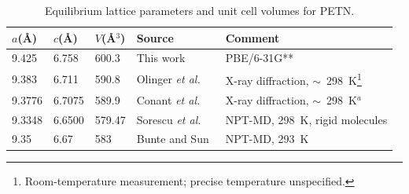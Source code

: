 \documentclass[prb,aps,nobibnotes,twocolumn,doublespace,twocolumngrid,superbib]{revtex4}
\begin{document}
 


\begin{table}[p]
\caption{Equilibrium lattice parameters and unit cell volumes for PETN.}
\begin{center}
\begin{tabular}{lllll}
\hline\hline
$a$(\AA) & $c$(\AA) & $V$(\AA$^3$) & Source & Comment\\
\hline
9.425  & 6.758  &  600.3  & This work & PBE/6-31G**\\
9.383  & 6.711  &  590.8  & Olinger {\it et al.}~\cite{Olinger_1975v62} 
& X-ray diffraction, $\sim$~298~K\footnote{Room-temperature measurement; 
precise temperature unspecified.}\\
9.3776 & 6.7075 &  589.9  & Conant {\it et al.}~\cite{Conant_1979} &
X-ray diffraction, $\sim$~298~K$^a$\\
9.3348 & 6.6500 &  579.47 & Sorescu {\it et al.}~\cite{Sorescu_1999v103} &
NPT-MD, 298~K, rigid molecules \\
9.35   & 6.67   &  583    & Bunte and Sun~\cite{Bunte_2000v104} &
 NPT-MD, 293~K \\
\hline\hline
\end{tabular}
\end{center}
\label{tab:table1}
\end{table}
\end{document}

